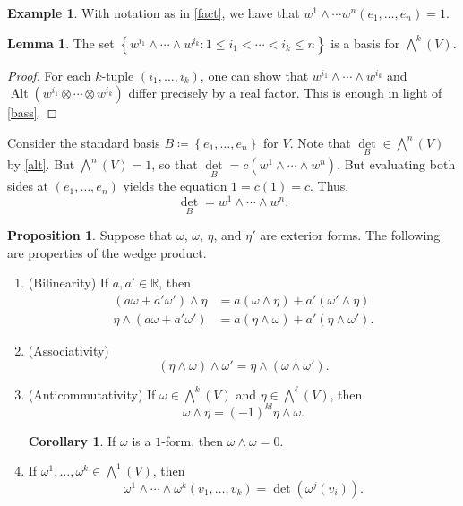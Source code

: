 \documentclass[10pt,letterpaper,cm]{nupset}
\theoremstyle{definition}
\newtheorem{exmp}[definition]{Example}
\theoremstyle{theorem}
\newtheorem{lemma}[definition]{Lemma}
\newtheorem{prop}[definition]{Proposition}
\newtheorem{corollary}[definition]{Corollary}
\theoremstyle{remark}
\newcommand{\R}{\mathbb R}
\newcommand{\1}{\mathbf{1}}
\newcommand{\0}{\vec 0}
\DeclareMathOperator{\Alt}{Alt}
\begin{document}
\begin{exmp}
With notation as in \cref{fact}, we have that $w^1 \wedge \cdots w^n(e_1, \ldots, e_n) =1$.
\end{exmp}

\begin{lemma}
The set $\left\{w^{i_1} \wedge \cdots \wedge w^{i_k}  : 1 \leq i_1 < \cdots < i_k \leq n\right\}$ is a basis for $\bigwedge^k(V)$.
\end{lemma}
\begin{proof}
For each $k$-tuple $\left(i_1, \ldots, i_k\right)$, one can show that $w^{i_1} \wedge \cdots \wedge w^{i_k}$ and $\Alt(w^{i_1} \otimes \cdots \otimes w^{i_k} )$ differ precisely by a real factor. This is enough in light of \cref{bass}.
\end{proof}

\smallskip

Consider the standard basis $B \coloneqq   \left\{e_1, \ldots, e_n\right\}$ for $V$. Note that $\underset{B}{\det} \in \bigwedge^n(V)$ by \cref{alt}.
But $\bigwedge^n(V) = 1$, so that $\underset{B}{\det} = c(w^1 \wedge \cdots \wedge w^n)$. But evaluating both sides at $(e_1, \ldots, e_n)$ yields the equation $1 = c(1) = c$. Thus, $$\underset{B}{\det} = w^1 \wedge \cdots \wedge w^n.$$

\smallskip

\begin{prop}\label{stuff} Suppose that $\omega$, $\omega$, $\eta$, and $\eta'$ are exterior forms. The following are properties of the wedge product.
\begin{enumerate}[label=(\arabic*)]
\item{(Bilinearity)} If $a, a' \in \R$, then 
\begin{align*}
(a\omega + a'\omega ')\wedge \eta &= a(\omega \wedge \eta) + a'(\omega' \wedge \eta)   \\   \eta \wedge (a\omega + a'\omega ') &= a(\eta \wedge \omega) + a'(\eta \wedge \omega' ). 
\end{align*}
\item{(Associativity)} $$(\eta \wedge \omega) \wedge \omega' =    \eta \wedge (\omega \wedge \omega') .$$
\item{(Anticommutativity)} If $\omega \in \bigwedge^k(V)$ and $\eta \in \bigwedge^{\ell}(V)$, then $$\omega \wedge \eta = \left({-1}\right)^{kl}\eta \wedge \omega.   $$
\begin{corollary}
If $\omega$ is a $1$-form, then $\omega \wedge \omega = 0$.
\end{corollary}
\item If $\omega^1, \ldots, \omega^k \in \bigwedge^1(V)$, then $$ \omega^1 \wedge \cdots \wedge \omega^k(v_1, \ldots, v_k) =\det(\omega^j(v_i)). $$ 
\end{enumerate}
\end{prop}
\end{document}

